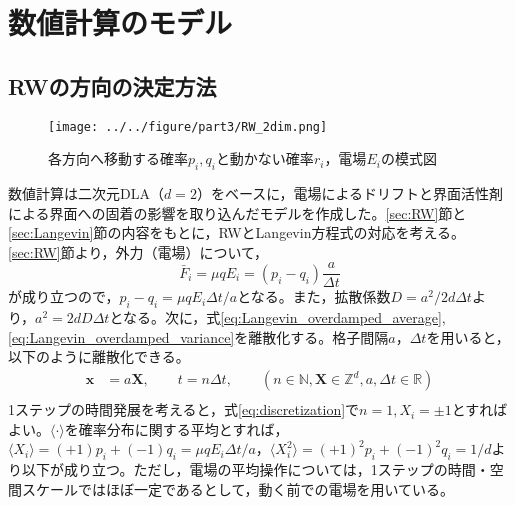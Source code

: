 \documentclass[autodetect-engine,dvi=dvipdfmx,a4paper,ja=standard,oneside,openany,11pt,draft]{bxjsbook}
\begin{document}
\section{数値計算のモデル}
\subsection{RWの方向の決定方法}
\begin{figure}[htbp]
  \centering
  \texttt{[image: ../../figure/part3/RW\_2dim.png]}
  \caption{各方向へ移動する確率$p_i,q_i$と動かない確率$r_i$，電場$E_i$の模式図}
  \label{fig:RW_2dim}
\end{figure}

数値計算は二次元DLA（$d=2$）をベースに，電場によるドリフトと界面活性剤による界面への固着の影響を取り込んだモデルを作成した。\ref{sec:RW}節と\ref{sec:Langevin}節の内容をもとに，RWとLangevin方程式の対応を考える。\ref{sec:RW}節より，外力（電場）について，
\begin{equation}
  \bar{F}_i=\mu q E_i=(p_i-q_i)\frac{a}{\Delta t}
  \label{eq:force}
\end{equation}が成り立つので，$p_i-q_i=\mu q E_i\Delta t/a$となる。また，拡散係数$D=a^2/2d\Delta t$より，$a^2=2dD\Delta t$となる。次に，式\ref{eq:Langevin_overdamped_average},\ref{eq:Langevin_overdamped_variance}を離散化する。格子間隔$a$，$\Delta t$を用いると，以下のように離散化できる。
\begin{equation}
  \begin{split}
    \bm{x} & =a\bm{X}, \qquad t=n\Delta t, \qquad (n\in\mathbb{N},\bm{X}\in\mathbb{Z}^d,a,\Delta t \in \mathbb{R}) \\
    \label{eq:discretization}
  \end{split}
\end{equation}
1ステップの時間発展を考えると，式\ref{eq:discretization}で$n=1,X_i=\pm1$とすればよい。$\langle\cdot\rangle$を確率分布に関する平均とすれば，$\langle X_i\rangle=(+1)p_i+(-1)q_i=\mu q E_i\Delta t/a$，$\langle X_i^2\rangle=(+1)^2p_i+(-1)^2q_i=1/d$より以下が成り立つ。ただし，電場の平均操作については，1ステップの時間・空間スケールではほぼ一定であるとして，動く前での電場を用いている。
\end{document}
